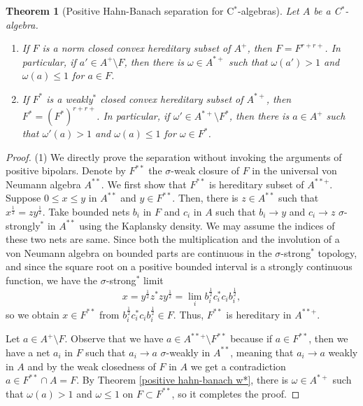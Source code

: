 \documentclass[a4paper]{amsart}
\theoremstyle{plain}
\newtheorem{thm}{Theorem}[section]
\theoremstyle{definition}
\begin{document}
\begin{thm}[Positive Hahn-Banach separation for C$^*$-algebras]
Let $A$ be a C$^*$-algebra.
\begin{enumerate}
\item If $F$ is a norm closed convex hereditary subset of $A^+$, then $F=F^{r+r+}$. In particular, if $a'\in A^+\setminus F$, then there is $\omega\in A^{*+}$ such that $\omega(a')>1$ and $\omega(a)\le1$ for $a\in F$.
\item If $F^*$ is a weakly$^*$ closed convex hereditary subset of $A^{*+}$, then $F^*=(F^*)^{r+r+}$. In particular, if $\omega'\in A^{*+}\setminus F^*$, then there is $a\in A^+$ such that $\omega'(a)>1$ and $\omega(a)\le1$ for $\omega\in F^*$.
\end{enumerate}
\end{thm}
\begin{proof}
(1)
We directly prove the separation without invoking the arguments of positive bipolars.
Denote by $F^{**}$ the $\sigma$-weak closure of $F$ in the universal von Neumann algebra $A^{**}$.
We first show that $F^{**}$ is hereditary subset of $A^{**+}$.
Suppose $0\le x\le y$ in $A^{**}$ and $y\in F^{**}$.
Then, there is $z\in A^{**}$ such that $x^{\frac12}=zy^{\frac12}$.
Take bounded nets $b_i$ in $F$ and $c_i$ in $A$ such that $b_i\to y$ and $c_i\to z$ $\sigma$-strongly$^*$ in $A^{**}$ using the Kaplansky density.
We may assume the indices of these two nets are same.
Since both the multiplication and the involution of a von Neumann algebra on bounded parts are continuous in the $\sigma$-strong$^*$ topology, and since the square root on a positive bounded interval is a strongly continuous function, we have the $\sigma$-strong$^*$ limit
\[x=y^{\frac12}z^*zy^{\frac12}=\lim_ib_i^{\frac12}c_i^*c_ib_i^{\frac12},\]
so we obtain $x\in F^{**}$ from $b_i^{\frac12}c_i^*c_ib_i^{\frac12}\in F$.
Thus, $F^{**}$ is hereditary in $A^{**+}$.

Let $a\in A^+\setminus F$.
Observe that we have $a\in A^{**+}\setminus F^{**}$ because if $a\in F^{**}$, then we have a net $a_i$ in $F$ such that $a_i\to a$ $\sigma$-weakly in $A^{**}$, meaning that $a_i\to a$ weakly in $A$ and by the weak closedness of $F$ in $A$ we get a contradiction $a\in F^{**}\cap A=F$.
By Theorem \ref{positive hahn-banach w*}, there is $\omega\in A^{*+}$ such that $\omega(a)>1$ and $\omega\le1$ on $F\subset F^{**}$, so it completes the proof.


\end{proof}
\end{document}
